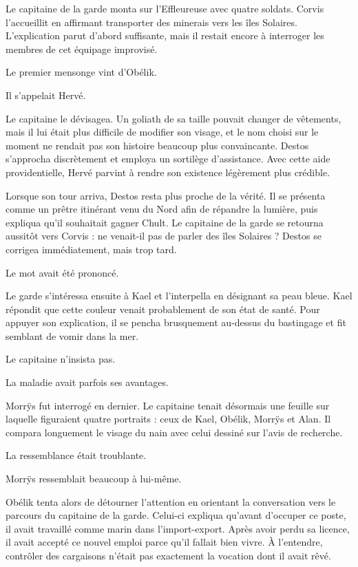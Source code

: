 Le capitaine de la garde monta sur l'Effleureuse avec quatre soldats. Corvis l'accueillit en affirmant transporter des minerais vers les îles Solaires. L'explication parut d'abord suffisante, mais il restait encore à interroger les membres de cet équipage improvisé.

Le premier mensonge vint d'Obélik.

Il s'appelait Hervé.

Le capitaine le dévisagea. Un goliath de sa taille pouvait changer de vêtements, mais il lui était plus difficile de modifier son visage, et le nom choisi sur le moment ne rendait pas son histoire beaucoup plus convaincante. Destos s'approcha discrètement et employa un sortilège d'assistance. Avec cette aide providentielle, Hervé parvint à rendre son existence légèrement plus crédible.

Lorsque son tour arriva, Destos resta plus proche de la vérité. Il se présenta comme un prêtre itinérant venu du Nord afin de répandre la lumière, puis expliqua qu'il souhaitait gagner Chult. Le capitaine de la garde se retourna aussitôt vers Corvis : ne venait-il pas de parler des îles Solaires ? Destos se corrigea immédiatement, mais trop tard.

Le mot avait été prononcé.

Le garde s'intéressa ensuite à Kael et l'interpella en désignant sa peau bleue. Kael répondit que cette couleur venait probablement de son état de santé. Pour appuyer son explication, il se pencha brusquement au-dessus du bastingage et fit semblant de vomir dans la mer.

Le capitaine n'insista pas.

La maladie avait parfois ses avantages.

Morrÿs fut interrogé en dernier. Le capitaine tenait désormais une feuille sur laquelle figuraient quatre portraits : ceux de Kael, Obélik, Morrÿs et Alan. Il compara longuement le visage du nain avec celui dessiné sur l'avis de recherche.

La ressemblance était troublante.

Morrÿs ressemblait beaucoup à lui-même.

Obélik tenta alors de détourner l’attention en orientant la conversation vers le parcours du capitaine de la garde. Celui-ci expliqua qu’avant d’occuper ce poste, il avait travaillé comme marin dans l’import-export. Après avoir perdu sa licence, il avait accepté ce nouvel emploi parce qu’il fallait bien vivre. À l’entendre, contrôler des cargaisons n’était pas exactement la vocation dont il avait rêvé.

